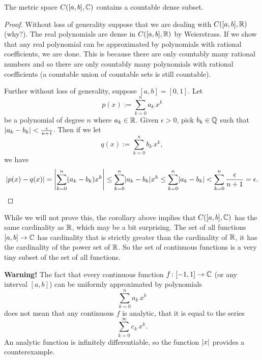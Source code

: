 \begin{cor}
The metric space $C([a,b],{\mathbb{C}})$ contains a countable dense subset.
\end{cor}

\begin{proof}
Without loss of generality suppose that we are dealing with $C([a,b],{\mathbb{R}})$
(why?).
The real polynomials are dense in $C([a,b],{\mathbb{R}})$ by Weierstrass.  If we show that
any real polynomial can be approximated by polynomials with rational
coefficients, we are done.  This is because there are only countably many
rational numbers and so there are only countably many polynomials with
rational coefficients (a countable union of countable sets is still
countable).

Further without loss of generality, suppose $[a,b]=[0,1]$.  Let
\begin{equation*}
p(x) := \sum_{k=0}^n a_k\,  x^k
\end{equation*}
be a polynomial of degree $n$ where $a_k \in {\mathbb{R}}$.  Given $\epsilon > 0$, pick $b_k \in {\mathbb{Q}}$
such that $\lvert {a_k-b_k} \rvert < \frac{\epsilon}{n+1}$.  Then
if we let
\begin{equation*}
q(x) := \sum_{k=0}^n b_k \, x^k ,
\end{equation*}
we have
\begin{equation*}
\lvert {p(x)-q(x)} \rvert
=
\left\lvert {\sum_{k=0}^n (a_k-b_k) x^k} \right\rvert
\leq
\sum_{k=0}^n \lvert {a_k-b_k} \rvert x^k
\leq
\sum_{k=0}^n \lvert {a_k-b_k} \rvert
<
\sum_{k=0}^n \frac{\epsilon}{n+1} = \epsilon . \qedhere
\end{equation*}
\end{proof}

\begin{remark}
While we will not prove this, the corollary above implies that
$C([a,b],{\mathbb{C}})$ has the same cardinality as ${\mathbb{R}}$, which may be a
bit surprising.  The set of all functions $[a,b] \to {\mathbb{C}}$ has
cardinality that is strictly greater than the cardinality of ${\mathbb{R}}$, it has the
cardinality of the power set of ${\mathbb{R}}$.  So the
set of continuous functions is a very tiny subset of the set of all
functions.
\end{remark}

\textbf{Warning!}
The fact that every continuous function $f \colon [-1,1] \to {\mathbb{C}}$ (or any
interval $[a,b]$) can be uniformly
approximated by polynomials
\begin{equation*}
\sum_{k=0}^n a_k\,  x^k
\end{equation*}
does not mean that any continuous $f$ is analytic, that it is equal to the
series
\begin{equation*}
\sum_{k=0}^\infty c_k\,  x^k .
\end{equation*}
An analytic function is infinitely differentiable, so the function
$\lvert {x} \rvert$ provides a counterexample.

